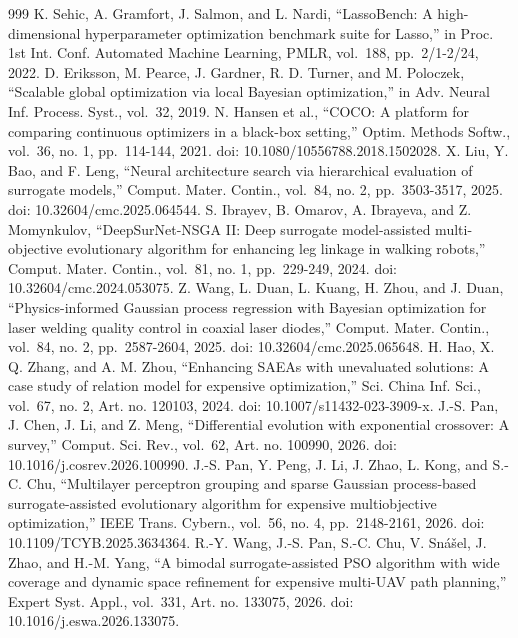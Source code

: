 \documentclass[cmc,article,submit,moreauthors,pdftex]{Definitions/tsp}
\begin{document}
\begin{thebibliography}{999}
K. Sehic, A. Gramfort, J. Salmon, and L. Nardi, ``LassoBench: A high-dimensional hyperparameter optimization benchmark suite for Lasso,'' in Proc. 1st Int. Conf. Automated Machine Learning, PMLR, vol.~188, pp.~2/1-2/24, 2022.
D. Eriksson, M. Pearce, J. Gardner, R. D. Turner, and M. Poloczek, ``Scalable global optimization via local Bayesian optimization,'' in Adv. Neural Inf. Process. Syst., vol.~32, 2019.
N. Hansen et al., ``COCO: A platform for comparing continuous optimizers in a black-box setting,'' Optim. Methods Softw., vol.~36, no. 1, pp.~114-144, 2021. doi: 10.1080/10556788.2018.1502028.
X. Liu, Y. Bao, and F. Leng, ``Neural architecture search via hierarchical evaluation of surrogate models,'' Comput. Mater. Contin., vol.~84, no. 2, pp.~3503-3517, 2025. doi: 10.32604/cmc.2025.064544.
S. Ibrayev, B. Omarov, A. Ibrayeva, and Z. Momynkulov, ``DeepSurNet-NSGA II: Deep surrogate model-assisted multi-objective evolutionary algorithm for enhancing leg linkage in walking robots,'' Comput. Mater. Contin., vol.~81, no. 1, pp.~229-249, 2024. doi: 10.32604/cmc.2024.053075.
Z. Wang, L. Duan, L. Kuang, H. Zhou, and J. Duan, ``Physics-informed Gaussian process regression with Bayesian optimization for laser welding quality control in coaxial laser diodes,'' Comput. Mater. Contin., vol.~84, no. 2, pp.~2587-2604, 2025. doi: 10.32604/cmc.2025.065648.
H. Hao, X. Q. Zhang, and A. M. Zhou, ``Enhancing SAEAs with unevaluated solutions: A case study of relation model for expensive optimization,'' Sci. China Inf. Sci., vol.~67, no. 2, Art. no. 120103, 2024. doi: 10.1007/s11432-023-3909-x.
J.-S. Pan, J. Chen, J. Li, and Z. Meng, ``Differential evolution with exponential crossover: A survey,'' Comput. Sci. Rev., vol.~62, Art. no. 100990, 2026. doi: 10.1016/j.cosrev.2026.100990.
J.-S. Pan, Y. Peng, J. Li, J. Zhao, L. Kong, and S.-C. Chu, ``Multilayer perceptron grouping and sparse Gaussian process-based surrogate-assisted evolutionary algorithm for expensive multiobjective optimization,'' IEEE Trans. Cybern., vol.~56, no. 4, pp.~2148-2161, 2026. doi: 10.1109/TCYB.2025.3634364.
R.-Y. Wang, J.-S. Pan, S.-C. Chu, V. Snášel, J. Zhao, and H.-M. Yang, ``A bimodal surrogate-assisted PSO algorithm with wide coverage and dynamic space refinement for expensive multi-UAV path planning,'' Expert Syst. Appl., vol.~331, Art. no. 133075, 2026. doi: 10.1016/j.eswa.2026.133075.
\end{thebibliography}
\end{document}
